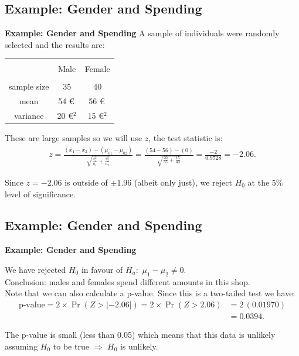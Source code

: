 \documentclass[compress]{beamer}        %
\makeatletter
\newcommand{\tcb}{\textcolor{beamer@blendedblue}}
\makeatother
\begin{document}
\subsection{Example: Gender and Spending}
\begin{frame}{\bf \tcb{Example: Gender and Spending}}
A sample of individuals were randomly selected and the results are:
\begin{center}
\begin{tabular}{|c|c|c|}
\hline
&&\\[-0.3cm]
& Male & Female \\
\hline
&&\\[-0.2cm]
sample size      & 35 & 40 \\[0.2cm]
mean   &  54\,\,\euro{\,}  & 56\,\,\euro{\,} \\[0.2cm]
variance & 20\,\,\euro{$^2$} & 15\,\,\euro{$^2$} \\[0.2cm]
\hline
\end{tabular}
\end{center}

These are large samples so we will use $z$, the test statistic is:
\begin{align*}
z=\frac{(\bar x_1 - \bar x_2)-(\mu_{01}-\mu_{02})}{\sqrt{\frac{s_1^2}{n_1}+\frac{s_2^2}{n_2}}}=
\frac{(54 - 56)-(0)}{\sqrt{\frac{20}{35}+\frac{15}{40}}} = \frac{-2}{0.9728} = -2.06.
\end{align*}

Since $z=-2.06$ is outside of $\pm1.96$ (albeit only just), we reject $H_0$ at the 5\% level of significance.

\end{frame}



\subsection{Example: Gender and Spending}
\begin{frame}{\bf \tcb{Example: Gender and Spending}}

We have rejected $H_0$ in favour of $H_a:\,\,\mu_1-\mu_2\ne0$.\\[0.8cm]

Conclusion: males and females spend different amounts in this shop.\\[0.8cm]

Note that we can also calculate a p-value. Since this is a two-tailed test we have:
\begin{align*}
\text{p-value} = 2\times\Pr(Z>|-2.06|)=2\times\Pr(Z>2.06)&=2\,(0.01970)\\
&=0.0394.
\end{align*}

The p-value is small (less than 0.05) which means that this data is unlikely assuming $H_0$ to be true $\Rightarrow$ $H_0$ is unlikely.
\end{frame}
\end{document}
